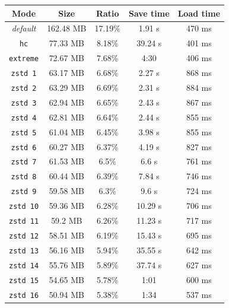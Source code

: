 \documentclass[hidelinks,titlepage,a4paper]{article}
\begin{document}
\begin{table}[h]
\centering
\begin{tabular}[h]{c|c|c|c|c}
\textbf{Mode} & \textbf{Size} & \textbf{Ratio} & \textbf{Save time} & \textbf{Load time} \\ \hline
\emph{default} & 162.48 MB & 17.19\% & 1.91 \si{\second} & 470 \si{\milli\second} \\
\texttt{hc} & 77.33 MB & 8.18\% & 39.24 \si{\second} & 401 \si{\milli\second} \\
\texttt{extreme} & 72.67 MB & 7.68\% & 4:30 & 406 \si{\milli\second} \\ \hline
\texttt{zstd 1} & 63.17 MB & 6.68\% & 2.27 \si{\second} & 868 \si{\milli\second} \\
\texttt{zstd 2} & 63.29 MB & 6.69\% & 2.31 \si{\second} & 884 \si{\milli\second} \\
\texttt{zstd 3} & 62.94 MB & 6.65\% & 2.43 \si{\second} & 867 \si{\milli\second} \\
\texttt{zstd 4} & 62.81 MB & 6.64\% & 2.44 \si{\second} & 855 \si{\milli\second} \\
\texttt{zstd 5} & 61.04 MB & 6.45\% & 3.98 \si{\second} & 855 \si{\milli\second} \\
\texttt{zstd 6} & 60.27 MB & 6.37\% & 4.19 \si{\second} & 827 \si{\milli\second} \\
\texttt{zstd 7} & 61.53 MB & 6.5\% & 6.6 \si{\second} & 761 \si{\milli\second} \\
\texttt{zstd 8} & 60.44 MB & 6.39\% & 7.84 \si{\second} & 746 \si{\milli\second} \\
\texttt{zstd 9} & 59.58 MB & 6.3\% & 9.6 \si{\second} & 724 \si{\milli\second} \\
\texttt{zstd 10} & 59.36 MB & 6.28\% & 10.29 \si{\second} & 706 \si{\milli\second} \\
\texttt{zstd 11} & 59.2 MB & 6.26\% & 11.23 \si{\second} & 717 \si{\milli\second} \\
\texttt{zstd 12} & 58.51 MB & 6.19\% & 15.43 \si{\second} & 695 \si{\milli\second} \\
\texttt{zstd 13} & 56.16 MB & 5.94\% & 35.55 \si{\second} & 642 \si{\milli\second} \\
\texttt{zstd 14} & 55.76 MB & 5.89\% & 37.74 \si{\second} & 627 \si{\milli\second} \\
\texttt{zstd 15} & 54.65 MB & 5.78\% & 1:01 & 600 \si{\milli\second} \\
\texttt{zstd 16} & 50.94 MB & 5.38\% & 1:34 & 537 \si{\milli\second} \\

\end{tabular}
\end{table}
\end{document}
